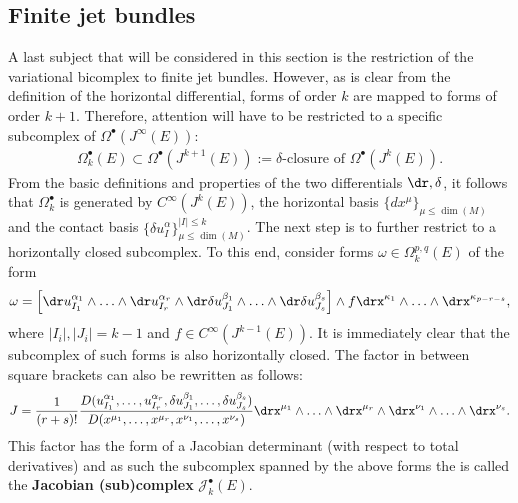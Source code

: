 \subsection{Finite jet bundles}

    A last subject that will be considered in this section is the restriction of the variational bicomplex to finite jet bundles. However, as is clear from the definition of the horizontal differential, forms of order $k$ are mapped to forms of order $k+1$. Therefore, attention will have to be restricted to a specific subcomplex of $\Omega^\bullet(J^\infty(E))$:
    \begin{gather}
        \Omega^\bullet_k(E)\subset\Omega^\bullet(J^{k+1}(E)) := \delta\text{-closure of }\Omega^\bullet(J^k(E)).
    \end{gather}
    From the basic definitions and properties of the two differentials $\dr,\delta$, it follows that $\Omega^\bullet_k$ is generated by $C^\infty(J^k(E))$, the horizontal basis $\{dx^\mu\}_{\mu\leq\dim(M)}$ and the contact basis $\{\delta u^\alpha_I\}_{\mu\leq\dim(M)}^{|I|\leq k}$.
    The next step is to further restrict to a horizontally closed subcomplex. To this end, consider forms $\omega\in\Omega^{p,q}_k(E)$ of the form
    \begin{gather}
        \omega = \Big[\dr u^{\alpha_1}_{I_1}\wedge\ldots\wedge \dr u^{\alpha_r}_{I_r}\wedge\dr\delta u^{\beta_1}_{J_1}\wedge\ldots\wedge\dr\delta u^{\beta_s}_{J_s}\Big]\wedge f\drx^{\kappa_1}\wedge\ldots\wedge \drx^{\kappa_{p-r-s}},
    \end{gather}
    where $|I_i|,|J_i|=k-1$ and $f\in C^\infty(J^{k-1}(E))$. It is immediately clear that the subcomplex of such forms is also horizontally closed. The factor in between square brackets can also be rewritten as follows:
    \begin{gather}
        J = \frac{1}{(r+s)!}\frac{D(u^{\alpha_1}_{I_1},\ldots,u^{\alpha_r}_{I_r},\delta u^{\beta_1}_{J_1},\ldots,\delta u^{\beta_s}_{J_s})}{D(x^{\mu_1},\ldots,x^{\mu_r},x^{\nu_1},\ldots,x^{\nu_s})}\drx^{\mu_1}\wedge\ldots\wedge\drx^{\mu_r}\wedge\drx^{\nu_1}\wedge\ldots\wedge\drx^{\nu_s}.
    \end{gather}
    This factor has the form of a Jacobian determinant (with respect to total derivatives) and as such the subcomplex spanned by the above forms the is called the \textbf{Jacobian (sub)complex} $\mathcal{J}^\bullet_k(E)$.


